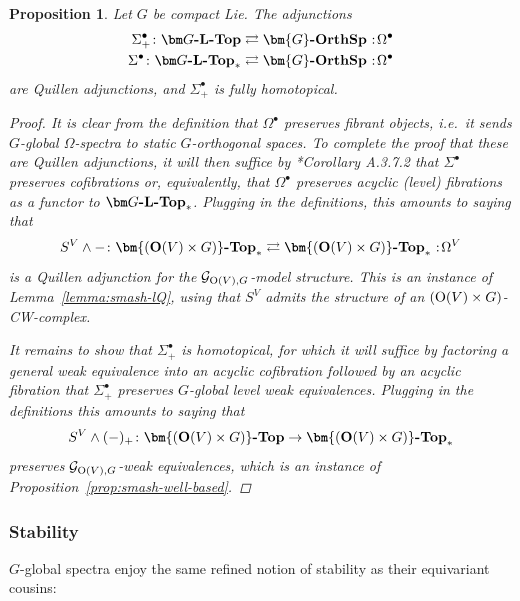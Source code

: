 \documentclass[reqno]{memo-l}
\theoremstyle{mythm}
\newtheorem{prop}[thm]{Proposition}
\theoremstyle{definition}
\numberwithin{equation}{section}
\newcommand{\cat}[1]{\textbf{\textup{#1}}}
\renewcommand{\O}{{\textup{O}}}
\let\smashp=\wedge
\newcommand\noloc{%
	\nobreak
	\mspace{6mu plus 1mu}
	{:}
	\nonscript\mkern-\thinmuskip
	\mathpunct{}
	\mspace{2mu}
}
\newcommand{\Gosp}[1]{\cat{$\bm{#1}$-OrthSp}}
\begin{document}
\begin{prop}\label{prop:Sigma-bullet-homotopical-left-Quillen}
    Let $G$ be compact Lie. The adjunctions
    \begin{align*}
        \Sigma^\bullet_+\colon\cat{$\bm G$-$\cat{L}$-Top}&\rightleftarrows\Gosp{G}\noloc\Omega^\bullet\\
        \Sigma^\bullet\colon\cat{$\bm G$-$\cat{L}$-Top}_*&\rightleftarrows\Gosp{G}\noloc\Omega^\bullet
    \end{align*}
    are Quillen adjunctions, and $\Sigma^\bullet_+$ is fully homotopical.
    \begin{proof}
        It is clear from the definition that $\Omega^\bullet$ preserves fibrant objects, i.e.\ it sends $G$-global $\Omega$-spectra to static $G$-orthogonal spaces. To complete the proof that these are Quillen adjunctions, it will then suffice by \cite{HTT}*{Corollary A.3.7.2} that $\Sigma^\bullet$ preserves cofibrations or, equivalently, that $\Omega^\bullet$ preserves acyclic (level) fibrations as a functor to $\cat{$\bm G$-$\cat{L}$-Top}_*$. Plugging in the definitions, this amounts to saying that
        \[
            S^V\smashp{-}\colon\cat{$\bm{(\O(V)\times G)}$-Top}_*\rightleftarrows\cat{$\bm{(\O(V)\times G)}$-Top}_*\noloc\Omega^V
        \] 
        is a Quillen adjunction for the $\mathcal G_{\O(V),G}$-model structure. This is an instance of Lemma~\ref{lemma:smash-lQ}, using  that $S^V$ admits the structure of an $(\O(V)\times G)$-CW-complex.

        It remains to show that $\Sigma^\bullet_+$ is homotopical, for which it will suffice by factoring a general weak equivalence into an acyclic cofibration followed by an acyclic fibration that $\Sigma^\bullet_+$ preserves $G$-global level weak equivalences. Plugging in the definitions this amounts to saying that
        \[
            S^V\smashp (-)_+\colon\cat{$\bm{(\O(V)\times G)}$-Top}\to\cat{$\bm{(\O(V)\times G)}$-Top}_*
        \]
        preserves $\mathcal G_{\O(V),G}$-weak equivalences, which is an instance of Proposition~\ref{prop:smash-well-based}.
    \end{proof}
\end{prop}

\subsubsection{Stability} $G$-global spectra enjoy the same refined notion of stability as their equivariant cousins:
\end{document}
